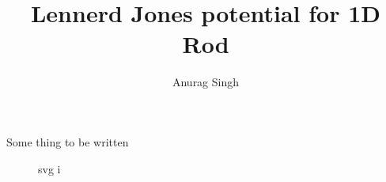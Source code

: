 \documentclass{article}
\title{Lennerd Jones potential for 1D Rod}
\author{Anurag Singh }
\begin{document}
Some thing to be written
\begin{figure}[htbp]
  \centering
  
  \caption{svg i}
\end{figure}
\end{document}
